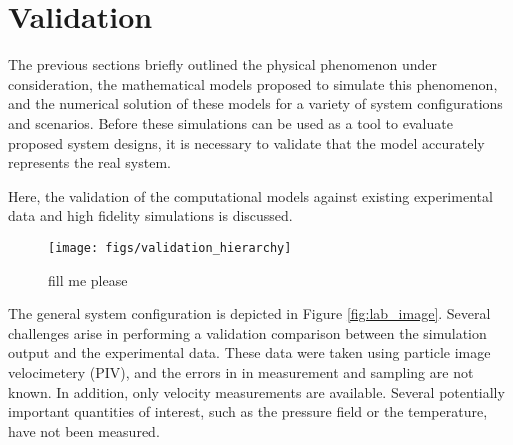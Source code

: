
\section{Validation}
\label{sec:validation}

%
%
%

%
%

The previous sections briefly outlined the physical phenomenon under
consideration, the mathematical models proposed to simulate this phenomenon,
and the numerical solution of these models 
for a variety of system configurations and scenarios. Before these
simulations can be used as a tool to evaluate proposed system  designs,
it is necessary to validate that the model accurately represents the
real system.  

Here, the validation of the computational models
against existing experimental data and high fidelity simulations is 
discussed.

 \begin{figure}[!htb]
   \begin{center}
    \texttt{[image: figs/validation\_hierarchy]}
    \caption{fill me please}
    \label{fig:val_hier}
   \end{center}
 \end{figure}


%
%

The general system configuration is depicted
in Figure \ref{fig:lab_image}. 
Several challenges arise in performing a validation comparison between the
simulation output and the experimental data. These data were taken using
particle image velocimetery (PIV), and the errors in 
in measurement and sampling are not known. 
In addition, only velocity measurements are available. Several
potentially important quantities of interest, such as the pressure field
or the temperature, have not been measured.





